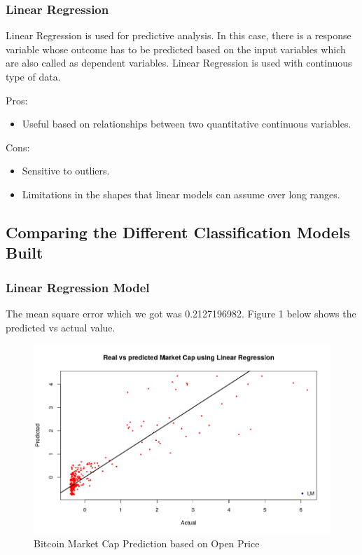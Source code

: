 \documentclass{article}
\begin{document}
\subsubsection{Linear Regression}

Linear Regression is used for predictive analysis. In this case, there is a response variable whose outcome has to be predicted based on the input variables which are also called as dependent variables. Linear Regression is used with continuous type of data. 

Pros:
\begin{itemize}
	\item Useful based on relationships between two quantitative continuous variables.
\end{itemize}

Cons:
\begin{itemize}
	\item Sensitive to outliers.
	\item Limitations in the shapes that linear models can assume over long ranges.
\end{itemize}

\subsection {Comparing the Different Classification Models Built}

\subsubsection{Linear Regression Model}

The mean square error which we got was  0.2127196982.
Figure 1 below shows the predicted vs actual value.

\begin{figure}
	\centering
	\includegraphics[width=\linewidth]{charts/bitcoin_market_cap_using_LR}
	\caption{Bitcoin Market Cap Prediction based on Open Price}
	\label{fig:Bitcoin Market Cap Prediction}
\end{figure}
\end{document}
